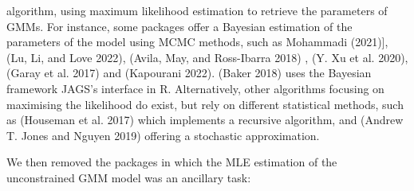 \begin{itemize}
  algorithm, using maximum likelihood estimation to retrieve the
  parameters of GMMs. For instance, some packages offer a Bayesian
  estimation of the parameters of the model using MCMC methods, such
  as  Mohammadi (2021){]},  (Lu, Li, and Love 2022),  (Avila, May, and Ross-Ibarra 2018)
  ,  (Y. Xu et al. 2020),  (Garay et al. 2017) and
   (Kapourani 2022).  (Baker 2018) uses the Bayesian
  framework JAGS's interface in R. Alternatively, other algorithms
  focusing on maximising the likelihood do exist, but rely on
  different statistical methods, such as  (Houseman et al. 2017)
  which implements a recursive algorithm, and 
  (Andrew T. Jones and Nguyen 2019) offering a stochastic approximation.
\end{itemize}

We then removed the packages in which the MLE estimation of the
unconstrained GMM model was an ancillary task:

